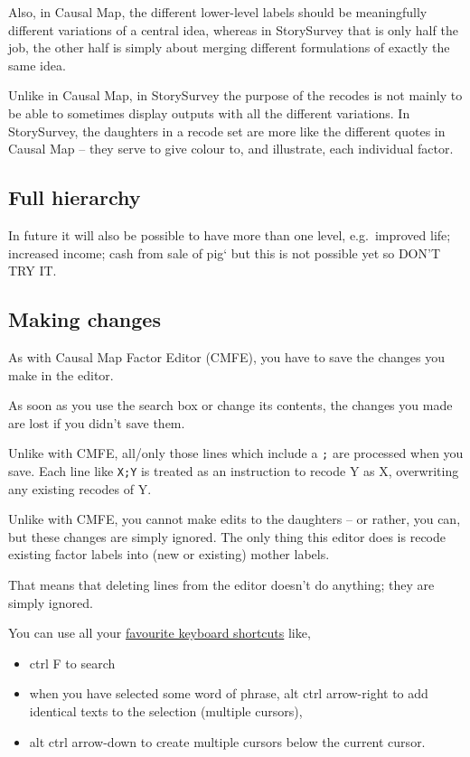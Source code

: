 \documentclass[
]{book}
\providecommand{\tightlist}{%
  \setlength{\itemsep}{0pt}\setlength{\parskip}{0pt}}
\begin{document}
Also, in Causal Map, the different lower-level labels should be meaningfully different variations of a central idea, whereas in StorySurvey that is only half the job, the other half is simply about merging different formulations of exactly the same idea.

Unlike in Causal Map, in StorySurvey the purpose of the recodes is not mainly to be able to sometimes display outputs with all the different variations. In StorySurvey, the daughters in a recode set are more like the different quotes in Causal Map -- they serve to give colour to, and illustrate, each individual factor.

\hypertarget{full-hierarchy}{%
\subsection{Full hierarchy}\label{full-hierarchy}}

In future it will also be possible to have more than one level, e.g.~improved life; increased income; cash from sale of pig` but this is not possible yet so DON'T TRY IT.

\hypertarget{making-changes}{%
\subsection{Making changes}\label{making-changes}}

As with Causal Map Factor Editor (CMFE), you have to save the changes you make in the editor.

As soon as you use the search box or change its contents, the changes you made are lost if you didn't save them.

Unlike with CMFE, all/only those lines which include a \texttt{;} are processed when you save. Each line like \texttt{X;Y} is treated as an instruction to recode Y as X, overwriting any existing recodes of Y.

Unlike with CMFE, you cannot make edits to the daughters -- or rather, you can, but these changes are simply ignored. The only thing this editor does is recode existing factor labels into (new or existing) mother labels.

That means that deleting lines from the editor doesn't do anything; they are simply ignored.

You can use all your \protect\hyperlink{xkeyboard}{favourite keyboard shortcuts} like,

\begin{itemize}
\tightlist
\item
  ctrl F to search
\item
  when you have selected some word of phrase, alt ctrl arrow-right to add identical texts to the selection (multiple cursors),
\item
  alt ctrl arrow-down to create multiple cursors below the current cursor.
\end{itemize}
\end{document}
